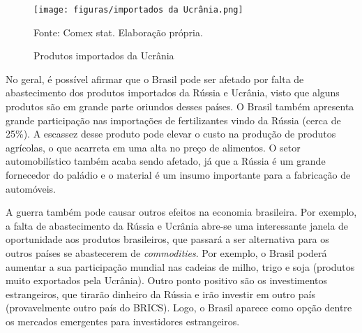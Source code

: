\documentclass[
article, %
12pt, %
oneside, %
a4paper, %
portuguese, %
portuguese %
]{abntex2}
\begin{document}






\begin{figure}[H]
    \centering
    \caption{Produtos importados da Ucrânia}
    \texttt{[image: figuras/importados da Ucrânia.png]}
    \begin{flushleft}
    Fonte: Comex stat. Elaboração própria.
    \end{flushleft}
    \label{fig:04}
\end{figure}

No geral, é possível afirmar que o Brasil pode ser afetado por falta de abastecimento dos produtos importados da Rússia e Ucrânia, visto que alguns produtos são em grande parte oriundos desses países. O Brasil também apresenta grande participação nas importações de fertilizantes vindo da Rússia (cerca de 25\%). A escassez desse produto pode elevar o custo na produção de produtos agrícolas, o que acarreta em uma alta no preço de alimentos. O setor automobilístico também acaba sendo afetado, já que a Rússia é um grande fornecedor do paládio e o material é um insumo importante para a fabricação de automóveis.

A guerra também pode causar outros efeitos na economia brasileira. Por exemplo, a falta de abastecimento da Rússia e Ucrânia abre-se uma interessante janela de oportunidade aos produtos brasileiros, que passará a ser alternativa para os outros países se abastecerem de \textit{commodities}. Por exemplo, o Brasil poderá aumentar a sua participação mundial nas cadeias de milho, trigo e soja (produtos muito exportados pela Ucrânia). Outro ponto positivo são os investimentos estrangeiros, que tirarão dinheiro da Rússia e irão investir em outro país (provavelmente outro país do BRICS). Logo, o Brasil aparece como opção dentre os mercados emergentes para investidores estrangeiros.
\end{document}
